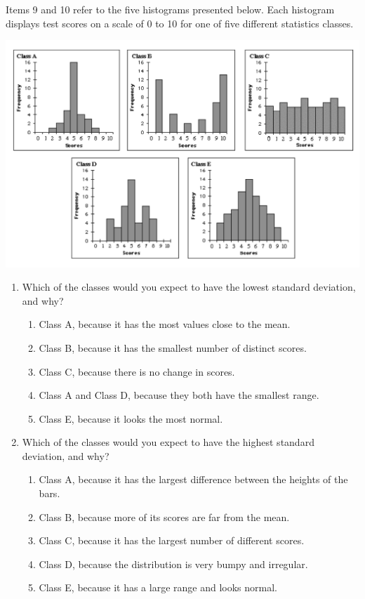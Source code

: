 \documentclass[11pt]{umnthesis}
\begin{document}
\noindent Items 9 and 10 refer to the five histograms presented below. Each histogram displays test scores on a scale of 0 to 10 for one of five different statistics classes.

\begin{center}\includegraphics[width=0.8\linewidth]{figure/drs-09} \end{center}

\begin{enumerate}
\def\labelenumi{\arabic{enumi}.}
\setcounter{enumi}{8}
\tightlist
\item
  Which of the classes would you expect to have the lowest standard deviation, and why?

  \begin{enumerate}
  \def\labelenumii{\alph{enumii}.}
  \tightlist
  \item
    Class A, because it has the most values close to the mean.
  \item
    Class B, because it has the smallest number of distinct scores.
  \item
    Class C, because there is no change in scores.
  \item
    Class A and Class D, because they both have the smallest range.
  \item
    Class E, because it looks the most normal.
  \end{enumerate}
\item
  Which of the classes would you expect to have the highest standard deviation, and why?

  \begin{enumerate}
  \def\labelenumii{\alph{enumii}.}
  \tightlist
  \item
    Class A, because it has the largest difference between the heights of the bars.
  \item
    Class B, because more of its scores are far from the mean.
  \item
    Class C, because it has the largest number of different scores.
  \item
    Class D, because the distribution is very bumpy and irregular.
  \item
    Class E, because it has a large range and looks normal.
  \end{enumerate}
\end{enumerate}
\end{document}
